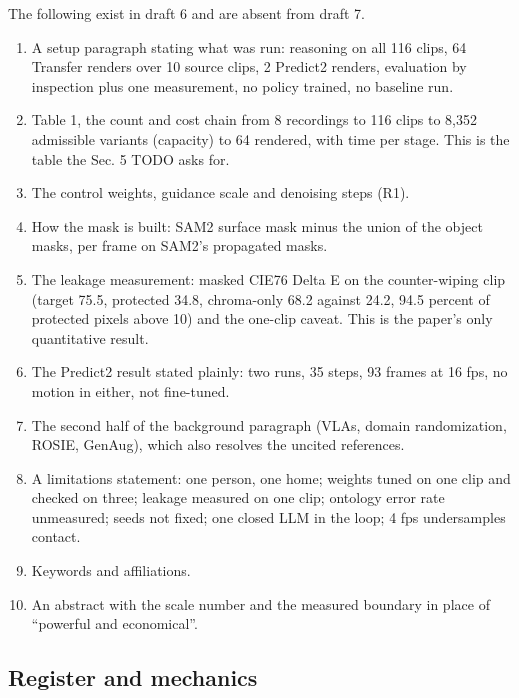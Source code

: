 \documentclass[
  11pt,
]{article}
\providecommand{\tightlist}{%
  \setlength{\itemsep}{0pt}\setlength{\parskip}{0pt}}
\begin{document}
The following exist in draft 6 and are absent from draft 7.

\begin{enumerate}
\def\labelenumi{\arabic{enumi}.}
\tightlist
\item
  A setup paragraph stating what was run: reasoning on all 116 clips, 64
  Transfer renders over 10 source clips, 2 Predict2 renders, evaluation
  by inspection plus one measurement, no policy trained, no baseline
  run.
\item
  Table 1, the count and cost chain from 8 recordings to 116 clips to
  8,352 admissible variants (capacity) to 64 rendered, with time per
  stage. This is the table the Sec. 5 TODO asks for.
\item
  The control weights, guidance scale and denoising steps (R1).
\item
  How the mask is built: SAM2 surface mask minus the union of the object
  masks, per frame on SAM2's propagated masks.
\item
  The leakage measurement: masked CIE76 Delta E on the counter-wiping
  clip (target 75.5, protected 34.8, chroma-only 68.2 against 24.2, 94.5
  percent of protected pixels above 10) and the one-clip caveat. This is
  the paper's only quantitative result.
\item
  The Predict2 result stated plainly: two runs, 35 steps, 93 frames at
  16 fps, no motion in either, not fine-tuned.
\item
  The second half of the background paragraph (VLAs, domain
  randomization, ROSIE, GenAug), which also resolves the uncited
  references.
\item
  A limitations statement: one person, one home; weights tuned on one
  clip and checked on three; leakage measured on one clip; ontology
  error rate unmeasured; seeds not fixed; one closed LLM in the loop; 4
  fps undersamples contact.
\item
  Keywords and affiliations.
\item
  An abstract with the scale number and the measured boundary in place
  of ``powerful and economical''.
\end{enumerate}

\subsection{Register and mechanics}\label{register-and-mechanics}
\end{document}
